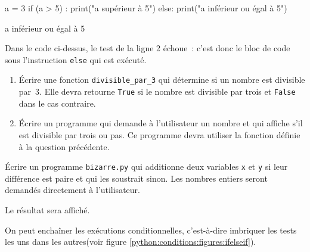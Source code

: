 \begin{multicols}{2}
\begin{pythonexemple}
a = 3
if (a > 5) :
    print("a supérieur à 5")
else:
    print("a inférieur ou égal à 5")
\end{pythonexemple}

\begin{result}
a inférieur ou égal à 5
\end{result}
\end{multicols}

Dans le code ci-dessus, le test de la ligne 2 échoue~: c'est donc le bloc de code sous l'instruction
\texttt{else} qui est exécuté.

\begin{exercice}
\begin{enumerate}\label{python:conditions:exos:divisible}
\item Écrire une fonction \texttt{divisible\_par\_3} qui détermine si un nombre est divisible par~$3$.
Elle devra retourne \texttt{True} si le nombre est divisible par trois et \texttt{False} dans le cas contraire.
\item Écrire un programme qui demande à l'utilisateur un nombre et qui affiche s'il est divisible par trois ou pas. Ce programme devra utiliser la fonction définie à la question précédente.
\end{enumerate}
\end{exercice}

\begin{exercice}
Écrire un programme \texttt{bizarre.py} qui additionne deux variables \texttt{x} et \texttt{y}
si leur différence est paire et qui les soustrait sinon.
Les nombres entiers seront  demandés directement à l'utilisateur.

Le résultat sera affiché.
\end{exercice}

On peut enchaîner les exécutions conditionnelles, c'est-à-dire imbriquer les tests les uns dans les
autres(voir figure \ref{python:conditions:figures:ifelseif}).

